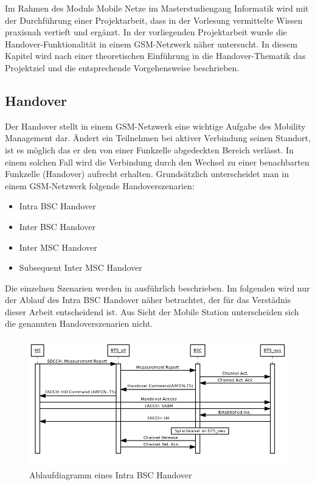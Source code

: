 
Im Rahmen des Moduls Mobile Netze im Masterstudiengang Informatik wird mit der Durchführung einer Projektarbeit, dass in der Vorlesung vermittelte Wissen praxisnah vertieft und  ergänzt. In der vorliegenden Projektarbeit wurde die Handover-Funktionalität in einem GSM-Netzwerk näher untersucht. In diesem Kapitel wird nach einer theoretischen Einführung in die Handover-Thematik das Projektziel und die entsprechende Vorgehensweise beschrieben.

\subsection{Handover}\label{sec:handover}

Der Handover stellt in einem GSM-Netzwerk eine wichtige Aufgabe des Mobility Management dar. Ändert ein Teilnehmen bei aktiver Verbindung seinen Standort, ist es möglich das er den von einer Funkzelle abgedeckten Bereich verlässt. In einem solchen Fall wird die Verbindung durch den Wechsel zu einer benachbarten Funkzelle (Handover) aufrecht erhalten. Grundsätzlich unterscheidet man in einem GSM-Netzwerk folgende Handoverszenarien:

\begin{itemize}
 \item Intra BSC Handover
 \item Inter BSC Handover
 \item Inter MSC Handover
 \item Subsequent Inter MSC Handover
\end{itemize}

Die einzelnen Szenarien werden in \cite{bib:grundkursmks} ausführlich beschrieben. Im folgenden wird nur der Ablauf des Intra BSC Handover näher betrachtet, der für das Verstädnis dieser Arbeit entscheidend ist. Aus Sicht der Mobile Station unterscheiden sich die genannten Handoverszenarien nicht.

\begin{figure}[h!]
  \centering
  \includegraphics[width=\textwidth]{img/ablauf_handover}
  \caption{Ablaufdiagramm eines Intra BSC Handover}
  \label{fig:adhandover}
\end{figure}

